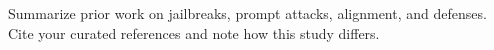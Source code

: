 Summarize prior work on jailbreaks, prompt attacks, alignment, and defenses. Cite your curated references and note how this study differs.
